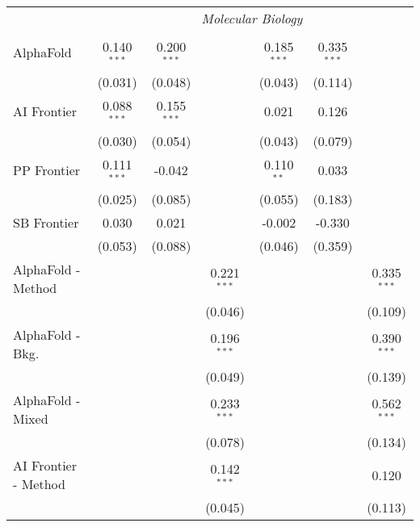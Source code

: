 \begin{tabular}{lcccccc}
 & \multicolumn{6}{c}{\textit{Molecular Biology}} \\ \\
   AlphaFold            & 0.140$^{***}$ & 0.200$^{***}$ &                & 0.185$^{***}$ & 0.335$^{***}$ &   \\   
                        & (0.031)       & (0.048)       &                & (0.043)       & (0.114)       &   \\   
   AI Frontier          & 0.088$^{***}$ & 0.155$^{***}$ &                & 0.021         & 0.126         &   \\   
                        & (0.030)       & (0.054)       &                & (0.043)       & (0.079)       &   \\   
   PP Frontier          & 0.111$^{***}$ & -0.042        &                & 0.110$^{**}$  & 0.033         &   \\   
                        & (0.025)       & (0.085)       &                & (0.055)       & (0.183)       &   \\   
   SB Frontier          & 0.030         & 0.021         &                & -0.002        & -0.330        &   \\   
                        & (0.053)       & (0.088)       &                & (0.046)       & (0.359)       &   \\   
   AlphaFold - Method   &               &               & 0.221$^{***}$  &               &               & 0.335$^{***}$\\   
                        &               &               & (0.046)        &               &               & (0.109)\\   
   AlphaFold - Bkg.     &               &               & 0.196$^{***}$  &               &               & 0.390$^{***}$\\   
                        &               &               & (0.049)        &               &               & (0.139)\\   
   AlphaFold - Mixed    &               &               & 0.233$^{***}$  &               &               & 0.562$^{***}$\\   
                        &               &               & (0.078)        &               &               & (0.134)\\   
   AI Frontier - Method &               &               & 0.142$^{***}$  &               &               & 0.120\\   
                        &               &               & (0.045)        &               &               & (0.113)\\   

\end{tabular}
